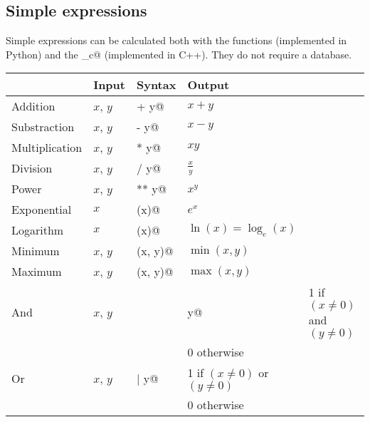 \documentclass[12pt,a4paper]{article}
\begin{document}
\subsection{Simple expressions}
Simple expressions can be calculated both with the functions
\lstinline@getValue@ (implemented in Python) and the \lstinline@getValue_c@ (implemented in C++). They do not require a database.
\begin{center}
\begin{tabular}{llll}
  &   Input  & Syntax & Output \\
  \hline
  Addition & $x$, $y$ & \lstinline@x + y@ & $x+y$ \\
  Substraction & $x$, $y$ & \lstinline@x - y@ & $x-y$ \\
  Multiplication & $x$, $y$ & \lstinline@x * y@ & $xy$ \\
  Division & $x$, $y$ & \lstinline@x / y@ & $\frac{x}{y}$ \\
  Power & $x$, $y$ & \lstinline@x ** y@ & $x^y$ \\
  Exponential & $x$ & \lstinline@exp(x)@ & $e^x$ \\
  Logarithm & $x$ & \lstinline@log(x)@ & $\ln(x) = \log_e(x)$ \\
  Minimum & $x$, $y$ & \lstinline@bioMin(x, y)@ & $\min(x, y)$ \\
  Maximum & $x$, $y$ & \lstinline@bioMax(x, y)@ & $\max(x, y)$ \\
  And & $x$, $y$ & \lstinline@x & y@ & 1 if $(x\neq 0)$ and $(y \neq 0)$ \\
      &          &                   & 0 otherwise \\
  Or & $x$, $y$ & \lstinline@x | y@ & 1 if $(x\neq 0)$ or $(y \neq 0)$ \\
      &          &                   & 0 otherwise \\
\end{tabular}
\end{center}
\end{document}
